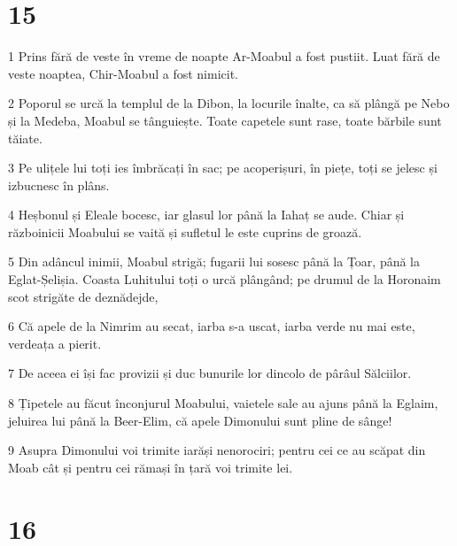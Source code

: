 \chapter{15}

\par 1 Prins fără de veste în vreme de noapte Ar-Moabul a fost pustiit. Luat fără de veste noaptea, Chir-Moabul a fost nimicit.
\par 2 Poporul se urcă la templul de la Dibon, la locurile înalte, ca să plângă pe Nebo și la Medeba, Moabul se tânguiește. Toate capetele sunt rase, toate bărbile sunt tăiate.
\par 3 Pe ulițele lui toți ies îmbrăcați în sac; pe acoperișuri, în piețe, toți se jelesc și izbucnesc în plâns.
\par 4 Heșbonul și Eleale bocesc, iar glasul lor până la Iahaț se aude. Chiar și războinicii Moabului se vaită și sufletul le este cuprins de groază.
\par 5 Din adâncul inimii, Moabul strigă; fugarii lui sosesc până la Țoar, până la Eglat-Șelișia. Coasta Luhitului toți o urcă plângând; pe drumul de la Horonaim scot strigăte de deznădejde,
\par 6 Că apele de la Nimrim au secat, iarba s-a uscat, iarba verde nu mai este, verdeața a pierit.
\par 7 De aceea ei își fac provizii și duc bunurile lor dincolo de pârâul Sălciilor.
\par 8 Țipetele au făcut înconjurul Moabului, vaietele sale au ajuns până la Eglaim, jeluirea lui până la Beer-Elim, că apele Dimonului sunt pline de sânge!
\par 9 Asupra Dimonului voi trimite iarăși nenorociri; pentru cei ce au scăpat din Moab cât și pentru cei rămași în țară voi trimite lei.

\chapter{16}

